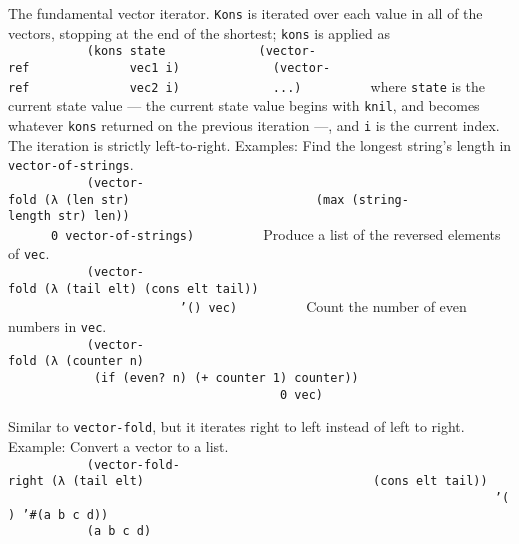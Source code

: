 \begin{entry}{%
   }

  The fundamental vector iterator. \texttt{Kons} is
  iterated over each value in all of the vectors, stopping at the end
  of the shortest; \texttt{kons} is applied as
  \texttt{~~~~~~~~~~~(kons~state~~~~~~~~~~~~~(vector-ref~~~~~~~~~~~~~~vec1~i)~~~~~~~~~~~~~(vector-ref~~~~~~~~~~~~~~vec2~i)~~~~~~~~~~~~~...)~~~~~~~~~}
  where \texttt{state} is the current state value --- the current
  state value begins with \texttt{knil}, and becomes whatever
  \texttt{kons} returned on the previous iteration ---, and \texttt{i}
  is the current index.  The iteration is strictly left-to-right.
  Examples: Find the
  longest string's length in \texttt{vector-of-strings}.\\
  \texttt{~~~~~~~~~~~(vector-fold~(λ~(len~str)~~~~~~~~~~~~~~~~~~~~~~~~~~(max~(string-length~str)~len))~~~~~~~~~~~~~~~~~~~~~~~~~~~~~~~~~~~~~~~~~~~~~~~~~~~~~~~~~~~0~vector-of-strings)~~~~~~~~~}
  Produce
  a list of the reversed elements of \texttt{vec}.\\
  \texttt{~~~~~~~~~~~(vector-fold~(λ~(tail~elt)~(cons~elt~tail))~~~~~~~~~~~~~~~~~~~~~~~~~~~~~~~~~~~~~~~~~~~~~~~~~~~~~~~~~~~'()~vec)~~~~~~~~~}
  Count
  the number of even numbers in \texttt{vec}.\\
  \texttt{~~~~~~~~~~~(vector-fold~(λ~(counter~n)~~~~~~~~~~~~~~~~~~~~~~~~~~~~~~~~~~~~~~~~~~~~~~~~~~~~~~~~~~~~~~~(if~(even?~n)~(+~counter~1)~counter))~~~~~~~~~~~~~~~~~~~~~~~~~~~~~~~~~~~~~~~~~~~~~~~~~~~~~~~~~~~0~vec)~~~~~~~~~}
\end{entry}

\begin{entry}{%
  } 

  Similar to \texttt{vector-fold}, but it
  iterates right to left instead of left to right.  Example: Convert a
  vector to a list.\\
  \texttt{~~~~~~~~~~~(vector-fold-right~(λ~(tail~elt)~~~~~~~~~~~~~~~~~~~~~~~~~~~~~~~~(cons~elt~tail))~~~~~~~~~~~~~~~~~~~~~~~~~~~~~~~~~~~~~~~~~~~~~~~~~~~~~~~~~~~~~~~~~~~~~~~'()~'\#(a~b~c~d))~~~~~~~~~}\\
  \texttt{~~~~~~~~~~~(a~b~c~d)~~~~~~~~~}
\end{entry}

